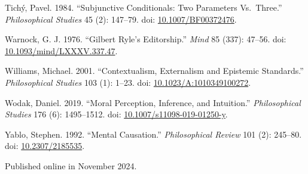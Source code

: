 \documentclass[
  10pt,
  letterpaper,
  DIV=11,
  numbers=noendperiod,
  twoside]{scrartcl}
\newlength{\cslhangindent}
\newenvironment{CSLReferences}[2] %
 {\begin{list}{}{%
  \setlength{\itemindent}{0pt}
  \setlength{\leftmargin}{0pt}
  \setlength{\parsep}{0pt}
  \ifodd #1
   \setlength{\leftmargin}{\cslhangindent}
   \setlength{\itemindent}{-1\cslhangindent}
  \fi
  \setlength{\itemsep}{#2\baselineskip}}}
 {\end{list}}
\begin{document}
\begin{CSLReferences}{1}{0}
Tichý, Pavel. 1984. {``Subjunctive Conditionals: Two Parameters
Vs.~Three.''} \emph{Philosophical Studies} 45 (2): 147--79. doi:
\href{https://doi.org/10.1007/BF00372476}{10.1007/BF00372476}.

Warnock, G. J. 1976. {``Gilbert Ryle's Editorship.''} \emph{Mind} 85
(337): 47--56. doi:
\href{https://doi.org/10.1093/mind/LXXXV.337.47}{10.1093/mind/LXXXV.337.47}.

Williams, Michael. 2001. {``Contextualism, Externalism and Epistemic
Standards.''} \emph{Philosophical Studies} 103 (1): 1--23. doi:
\href{https://doi.org/10.1023/A:1010349100272}{10.1023/A:1010349100272}.

Wodak, Daniel. 2019. {``Moral Perception, Inference, and Intuition.''}
\emph{Philosophical Studies} 176 (6): 1495--1512. doi:
\href{https://doi.org/10.1007/s11098-019-01250-y}{10.1007/s11098-019-01250-y}.

Yablo, Stephen. 1992. {``Mental Causation.''} \emph{Philosophical
Review} 101 (2): 245--80. doi:
\href{https://doi.org/10.2307/2185535}{10.2307/2185535}.

\end{CSLReferences}



\noindent Published online in November 2024.
\end{document}
